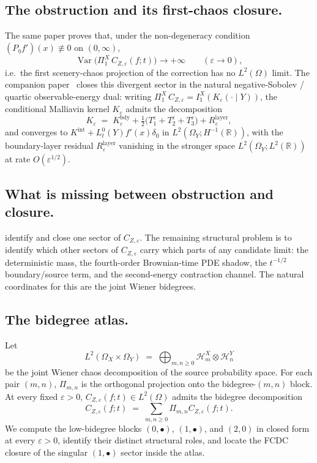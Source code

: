 \documentclass[11pt,reqno]{amsart}
\theoremstyle{plain}
\theoremstyle{definition}
\theoremstyle{remark}
\newcommand{\R}{\mathbb{R}}
\newcommand{\Hilb}{\mathcal{H}}
\newcommand{\IBM}{Z}
\newcommand{\Pir}{\Pi}
\DeclareMathOperator{\Var}{Var}
\begin{document}
\subsection*{The obstruction and its first-chaos closure.}
The same paper proves that, under the non-degeneracy condition
$(P_\eta f')(x)\not\equiv 0$ on $(0,\infty)$,
\begin{equation}\label{eq:obstr}
 \Var\bigl(\Pir_1^X\,C_{\IBM,\varepsilon}(f;t)\bigr)\longrightarrow+\infty
 \qquad(\varepsilon\to 0),
\end{equation}
i.e.\ the first scenery-chaos projection of the correction has no
$L^{2}(\Omega)$ limit. The companion paper~\cite{Fontes-FCDC} closes
this divergent sector in the natural negative-Sobolev / quartic
observable-energy dual: writing
$\Pir_1^X\,C_{\IBM,\varepsilon}=I_1^X(K_\varepsilon(\cdot\mid Y))$,
the conditional Malliavin kernel $K_\varepsilon$ admits the
decomposition
\begin{equation}\label{eq:K-decomp}
 K_\varepsilon
 \;=\;K_\varepsilon^{\mathrm{bdy}}
   +\tfrac12\bigl(T_1^\varepsilon+T_2^\varepsilon+T_3^\varepsilon\bigr)
   +R_\varepsilon^{\mathrm{layer}},
\end{equation}
and converges to $K^{\mathrm{int}}+L_t^0(Y)f'(x)\delta_0$ in
$L^{2}(\Omega_Y;H^{-1}(\R))$, with the boundary-layer residual
$R_\varepsilon^{\mathrm{layer}}$ vanishing in the stronger space
$L^{2}(\Omega_Y;L^{2}(\R))$ at rate $O(\varepsilon^{1/2})$.

\subsection*{What is missing between obstruction and closure.}
 identify and close one sector of
$C_{\IBM,\varepsilon}$. The remaining structural problem is to
identify which other sectors of $C_{\IBM,\varepsilon}$ carry which
parts of any candidate limit: the deterministic mass, the
fourth-order Brownian-time PDE shadow, the $t^{-1/2}$
boundary/source term, and the second-energy contraction channel.
The natural coordinates for this are the joint Wiener bidegrees.

\subsection*{The bidegree atlas.}
Let
\[
 L^{2}(\Omega_X\times\Omega_Y)
 \;=\;\bigoplus_{m,n\ge 0}\Hilb_m^X\otimes\Hilb_n^Y
\]
be the joint Wiener chaos decomposition of the source probability
space. For each pair $(m,n)$, $\Pir_{m,n}$ is the orthogonal
projection onto the bidegree-$(m,n)$ block. At every fixed
$\varepsilon>0$, $C_{\IBM,\varepsilon}(f;t)\in L^{2}(\Omega)$ admits
the bidegree decomposition
\begin{equation}\label{eq:atlas}
 C_{\IBM,\varepsilon}(f;t)
 \;=\;\sum_{m,n\ge 0}\Pir_{m,n}C_{\IBM,\varepsilon}(f;t).
\end{equation}
We compute the low-bidegree blocks $(0,\bullet)$, $(1,\bullet)$, and
$(2,0)$ in closed form at every $\varepsilon>0$, identify their
distinct structural roles, and locate the FCDC closure of the
singular $(1,\bullet)$ sector inside the atlas.
\end{document}
